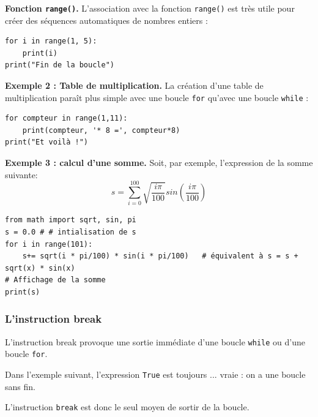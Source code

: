 \documentclass{beamer}
\begin{document}
\begin{frame}

\noindent\textbf{Fonction \texttt{range()}.}
L'association avec la fonction \texttt{range()} est très utile pour créer des séquences automatiques de nombres entiers :

\begin{verbatim}
for i in range(1, 5):
    print(i)
print("Fin de la boucle")
\end{verbatim}
\end{frame}

\begin{frame}

\noindent\textbf{Exemple 2 : Table de multiplication.}
La création d'une table de multiplication paraît plus simple avec une boucle \texttt{for} qu'avec une boucle \texttt{while} :

\begin{verbatim}
for compteur in range(1,11):
    print(compteur, '* 8 =', compteur*8)
print("Et voilà !")
\end{verbatim}
\end{frame}

\begin{frame}

\noindent\textbf{Exemple 3 : calcul d'une somme.}
Soit, par exemple, l'expression de la somme suivante:
\[
s = \sum_{i = 0}^{100} \sqrt{\frac{i \pi}{100}} sin(\frac{i \pi}{100})
\]

\begin{verbatim}
from math import sqrt, sin, pi
s = 0.0 # # intialisation de s
for i in range(101):
    s+= sqrt(i * pi/100) * sin(i * pi/100)   # équivalent à s = s + sqrt(x) * sin(x)
# Affichage de la somme
print(s)
\end{verbatim}
\end{frame}

\begin{frame}
\frametitle{L'instruction break}

L'instruction break provoque une sortie immédiate d'une boucle \texttt{while} ou d'une boucle \texttt{for}.

Dans l'exemple suivant, l'expression \texttt{True} est toujours ... vraie : on a une boucle sans fin.

L'instruction \texttt{break} est donc le seul moyen de sortir de la boucle.
\end{frame}
\end{document}
